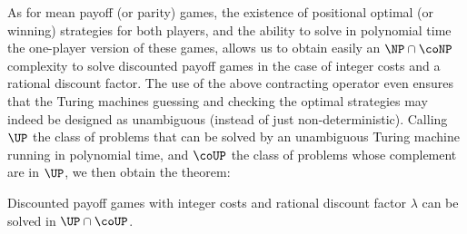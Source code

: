 As for mean payoff (or parity) games, the existence of positional
optimal (or winning) strategies for both players, and the ability to
solve in polynomial time the one-player version of these games, allows
us to obtain easily an $\NP\cap\coNP$ complexity to solve
discounted payoff games in the case of integer costs and a rational
discount factor. The use of the above contracting operator even
ensures that the Turing machines guessing and checking the optimal
strategies may indeed be designed as unambiguous (instead of just
non-deterministic). Calling $\UP$ the class of problems that can be
solved by an unambiguous Turing machine running in polynomial time,
and $\coUP$ the class of problems whose complement are in $\UP$, we
then obtain the theorem:
\begin{theorem}\label{4-thm:disc-up}
  Discounted payoff games with integer costs and rational discount
  factor $\lambda$ can be solved in $\UP\cap\coUP$.
\end{theorem}
